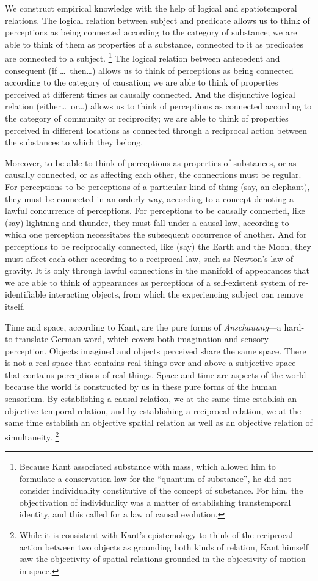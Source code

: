 \documentclass[smallextended]{svjour3}
\begin{document}
We construct empirical knowledge with the help of logical and spatiotemporal relations. The logical relation between subject and predicate allows us to think of perceptions as being connected according to the {category of substance}; we are able to think of them as properties of a substance, connected to it as predicates are connected to a subject.%
\footnote{Because Kant associated substance with mass, which allowed him to formulate a conservation law for the ``quantum of substance'',\cite{KantCPR3} he did not consider individuality constitutive of the concept of substance. For him, the objectivation of individuality was a matter of establishing transtemporal identity, and this called for a law of causal evolution.}
The logical relation between antecedent and consequent (if \dots\ then\dots) allows us to think of perceptions as being connected according to the {category of causation}; we are able to think of properties perceived at different times as causally connected. And the disjunctive logical relation (either\dots\ or\dots) allows us to think of perceptions as connected according to the category of community or reciprocity; we are able to think of properties perceived in different locations as connected through a reciprocal action between the substances to which they belong.

Moreover, to be able to think of perceptions as properties of substances, or as causally connected, or as affecting each other, the connections must be regular. For perceptions to be perceptions of a particular kind of thing (say, an elephant), they must be connected in an orderly way, according to a concept denoting a lawful concurrence of perceptions. For perceptions to be causally connected, like (say) lightning and thunder, they must fall under a causal law, according to which one perception necessitates the subsequent occurrence of another. And for perceptions to be reciprocally connected, like (say) the Earth and the Moon, they must affect each other according to a reciprocal law, such as Newton's law of gravity. It is only through lawful connections in the {manifold of appearances} that we are able to think of appearances as perceptions of a self-existent system of re-identifiable interacting objects, from which the experiencing subject can remove itself. 

Time and space, according to Kant, are the pure forms of \emph{Anschauung}---a hard-to-translate German word, which covers both imagination and sensory perception. Objects imagined and objects perceived share the same space. There is not a real space that contains real things over and above a subjective space that contains perceptions of real things. Space and time are aspects of the world because the world is constructed by us in these pure forms of the human sensorium. By establishing a causal relation, we at the same time establish an objective temporal relation, and by establishing a reciprocal relation, we at the same time establish an objective spatial relation as well as an objective relation of simultaneity.%
\footnote{While it is consistent with Kant's epistemology to think of the reciprocal action between two objects as grounding both kinds of relation, Kant himself saw the objectivity of spatial relations grounded in the objectivity of motion in space.}
\end{document}
